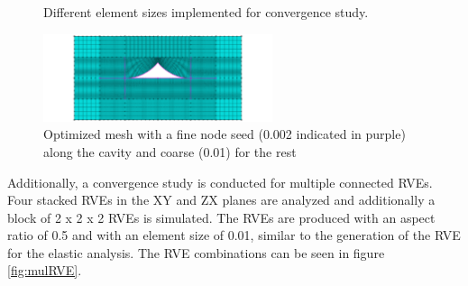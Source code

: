 \begin{figure}[htb]
  \caption{Different element sizes implemented for convergence study.}
  \label{fig:meshes}
\end{figure}
\begin{figure}[htb]
    \centering
    \includegraphics[width=0.60\textwidth]{chapter_7_non-elasticmodelling/figures/meshopt.png}
    \caption{Optimized mesh with a fine node seed (0.002 indicated in purple) along the cavity and coarse (0.01) for the rest}
    \label{fig:meshopt}
\end{figure}

Additionally, a convergence study is conducted for multiple connected RVEs. Four stacked RVEs in the XY and ZX planes are analyzed and additionally a block of 2 x 2 x 2 RVEs is simulated. The RVEs are produced with an aspect ratio of 0.5 and with an element size of 0.01, similar to the generation of the RVE for the elastic analysis. The RVE combinations can be seen in figure \ref{fig:mulRVE}.

